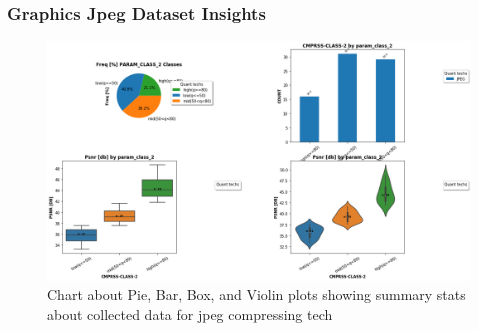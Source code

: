



\begin{frame}
\frametitle{Graphics Jpeg Dataset Insights}


\begin{figure}
\includegraphics[scale=0.3]{slides/experiments/jpeg_dataset/jpeg_bpp_vs_psnr_pbbv_param_class.png}
\caption{Chart about Pie, Bar, Box, and Violin plots showing summary stats about collected data for jpeg compressing tech}
\end{figure}

\end{frame}